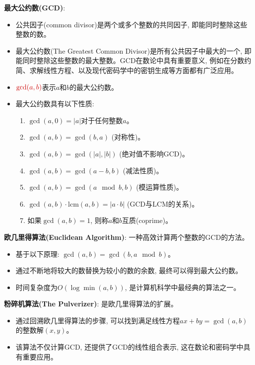 \documentclass[12pt, a4paper, UTF8]{ctexart}
\newcommand{\term}[1]{\textbf{\textcolor{blue!80!black}{#1}}}
\newcommand{\mhl}[1]{\textcolor{red!80!black}{#1}}
\begin{document}
\begin{sloppypar}
    \term{最大公约数(GCD)}:
    \begin{itemize}[nosep]
        \item 公共因子(common divisor)是两个或多个整数的共同因子, 即能同时整除这些整数的数。
        \item 最大公约数(The Greatest Common Divisor)是所有公共因子中最大的一个, 即能同时整除这些整数的最大整数。GCD在数论中具有重要意义, 例如在分数约简、求解线性方程、以及现代密码学中的密钥生成等方面都有广泛应用。
        \item $\mhl{\gcd(a, b)}$表示$a$和$b$的最大公约数。
        \item 最大公约数具有以下性质:
              \begin{enumerate}[nosep]
                  \item $\gcd(a, 0) = |a|$对于任何整数$a$。
                  \item $\gcd(a, b) = \gcd(b, a)$ (对称性)。
                  \item $\gcd(a, b) = \gcd(|a|, |b|)$ (绝对值不影响GCD)。
                  \item $\gcd(a, b) = \gcd(a - b, b)$ (减法性质)。
                  \item $\gcd(a, b) = \gcd(a \mod b, b)$ (模运算性质)。
                  \item $\gcd(a, b) \cdot \mathrm{lcm}(a, b) = |a \cdot b|$ (GCD与LCM的关系)。
                  \item 如果$\gcd(a, b) = 1$, 则称$a$和$b$互质(coprime)。
              \end{enumerate}
    \end{itemize}
    \term{欧几里得算法(Euclidean Algorithm)}: 一种高效计算两个整数的GCD的方法。
    \begin{itemize}[nosep]
        \item 基于以下原理: $\gcd(a, b) = \gcd(b, a \mod b)$。
        \item 通过不断地将较大的数替换为较小的数的余数, 最终可以得到最大公约数。
        \item 时间复杂度为$O(\log \min(a, b))$, 是计算机科学中最经典的算法之一。
    \end{itemize}
    \term{粉碎机算法(The Pulverizer)}: 是欧几里得算法的扩展。
    \begin{itemize}[nosep]
        \item 通过回溯欧几里得算法的步骤, 可以找到满足线性方程$ax + by = \gcd(a, b)$的整数解$(x, y)$。
        \item 该算法不仅计算GCD, 还提供了GCD的线性组合表示, 这在数论和密码学中具有重要应用。

\end{itemize}
\end{sloppypar}
\end{document}

